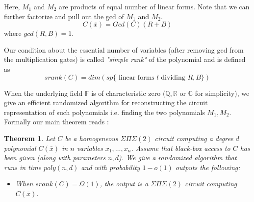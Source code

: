 \documentclass[12pt]{caltech_thesis}
\theoremstyle{plain}
\newtheorem{theorem}{Theorem}
\theoremstyle{definition}
\newcommand{\F}{\mathbb{F}}
\newcommand{\C}{\mathbb{C}}
\newcommand{\Q}{\mathbb{Q}}
\newcommand{\R}{\mathbb{R}}
\newcommand{\B}[1]{\bar{#1}}
\begin{document}
Here, $M_1$ and $M_2$ are products of equal number of linear forms. Note that we can further factorize and pull out the gcd of $M_1$ and $M_2$. 
\[
 C(\B x) = Gcd(C)(R+B)
\]
where $gcd(R,B) = 1$. 

Our condition about the essential number of variables (after removing gcd from
the multiplication gates) is called \emph{"simple rank"} of the polynomial and is defined as
\[
 srank(C) = dim (sp\{\text{ linear forms }l \text{ dividing }R,B\})
\]

\par{}
When the underlying field $\F$ is of characteristic zero ($\Q,\R$ or $\C$ for simplicity), 
we give an efficient randomized algorithm for reconstructing the  circuit
representation of such polynomials i.e. finding the two polynomials $M_1,M_2$. Formally our main theorem reads :

\begin{theorem}\label{theorem:maintheorem2}
Let $C$ be a homogeneous $\Sigma\Pi\Sigma(2)$ circuit computing a degree $d$ polynomial $C(\B{x})$ in $n$ variables $x_1,\ldots,x_n$. 
Assume that black-box access to 
$C$ has been given (along with parameters $n,d$). We give a randomized algorithm that runs in time $poly(n,d)$ and with 
 probability $1-o(1)$ outputs the following:
\begin{itemize}
 \item When $srank(C)=\Omega(1)$, the output is a $\Sigma\Pi\Sigma(2)$ circuit computing $C(\B{x})$.
 \end{itemize}
\end{theorem}
\end{document}
